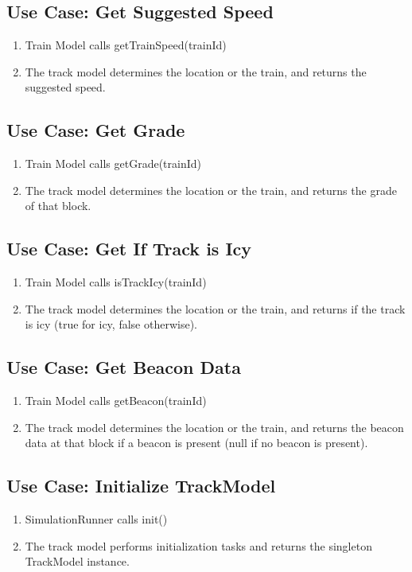 \documentclass{scrreprt}
\begin{document}
\subsection{Use Case: Get Suggested Speed}
\begin{enumerate}
	\item Train Model calls getTrainSpeed(trainId)
	\item The track model determines the location or the train, and returns the suggested speed.
\end{enumerate}

\subsection{Use Case: Get Grade}
\begin{enumerate}
	\item Train Model calls getGrade(trainId)
	\item The track model determines the location or the train, and returns the grade of that block.
\end{enumerate}

\subsection{Use Case: Get If Track is Icy}
\begin{enumerate}
	\item Train Model calls isTrackIcy(trainId)
	\item The track model determines the location or the train, and returns if the track is icy (true for icy, false otherwise).
\end{enumerate}

\subsection{Use Case: Get Beacon Data}
\begin{enumerate}
	\item Train Model calls getBeacon(trainId)
	\item The track model determines the location or the train, and returns the beacon data at that block if a beacon is present (null if no beacon is present).
\end{enumerate}

\subsection{Use Case: Initialize TrackModel}
\begin{enumerate}
	\item SimulationRunner calls init()
	\item The track model performs initialization tasks and returns the singleton TrackModel instance.
\end{enumerate}
\end{document}
